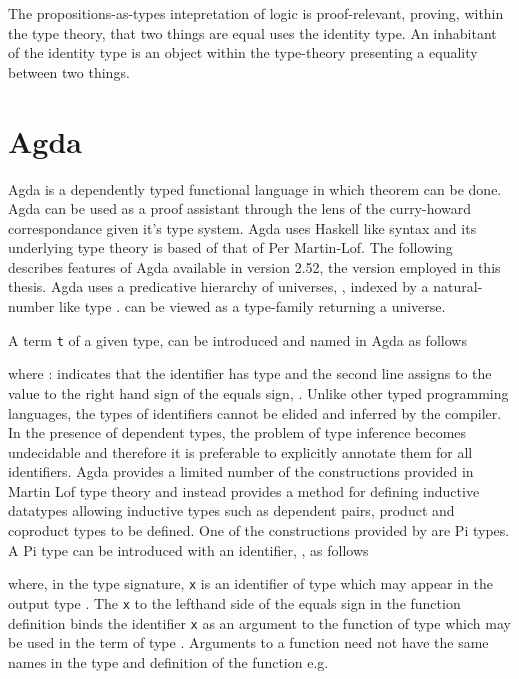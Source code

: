 The propositions-as-types intepretation of logic is
proof-relevant, proving, within the type theory, that two things are equal uses
the identity type. An inhabitant of the identity type is an object within the
type-theory presenting a equality between two things.


\section{Agda}

Agda is a dependently typed functional language in which theorem can be done.
Agda can be used as a proof assistant through the lens of the curry-howard
correspondance given it's type system. Agda uses Haskell like syntax and its
underlying type theory is based of that of Per Martin-Lof. The following
describes features of Agda available in version 2.52, the version employed in
this thesis. Agda uses a predicative hierarchy of universes,
, indexed by a natural-number like type
.  can be viewed as a type-family
returning a universe.

A term \verb|t| of a given type,  can be introduced and named
in Agda as follows



where  :  indicates that the identifier
 has type  and the second line assigns to
 the value to the right hand sign of the equals sign,
. Unlike other typed programming languages, the types of
identifiers cannot be elided and inferred by the compiler. In the presence of
dependent types, the problem of type inference becomes undecidable and therefore
it is preferable to explicitly annotate them for all identifiers. Agda provides
a limited number of the constructions provided in Martin Lof type theory and
instead provides a method for defining inductive datatypes allowing inductive
types such as dependent pairs, product and coproduct types to be defined. One of
the constructions provided by are Pi types. A Pi type can be introduced with an
identifier, , as follows


where, in the type signature, \verb|x| is an identifier of type 
which may appear in the output type . The \verb|x| to the
lefthand side of the equals sign in the function definition binds the identifier
\verb|x| as an argument to the function of type  which may be
used in the term  of type . Arguments to a
function need not have the same names in the type and definition of the function
e.g.

